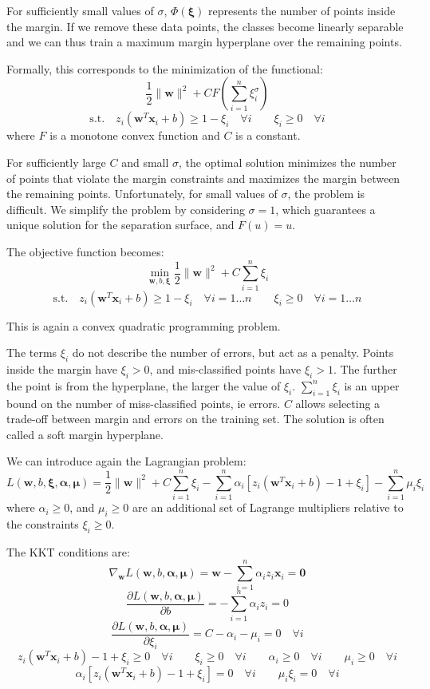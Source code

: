 For sufficiently small values of $\sigma$, $\Phi(\boldsymbol{\xi})$ represents the number of points inside the
margin. If we remove these data points, the classes become linearly separable and we can
thus train a maximum margin hyperplane over the remaining points.

Formally, this corresponds to the minimization of the functional:
\[
\frac{1}{2}\|\mathbf{w}\|^2 + CF\left(\sum_{i=1}^n \xi_i^\sigma\right)
\]
\[
\text{s.t.} \quad z_i(\mathbf{w}^T \mathbf{x}_i + b) \geq 1 - \xi_i \quad \forall i \qquad \xi_i \geq 0 \quad \forall i
\]
where $F$ is a monotone convex function and $C$ is a constant.

For sufficiently large $C$ and small $\sigma$, the optimal solution minimizes the number of points
that violate the margin constraints and maximizes the margin between the remaining
points. Unfortunately, for small values of $\sigma$, the problem is difficult. We simplify the
problem by considering $\sigma = 1$, which guarantees a unique solution for the separation
surface, and $F(u) = u$.

The objective function becomes:
\[
\min_{\mathbf{w},b,\boldsymbol{\xi}} \frac{1}{2}\|\mathbf{w}\|^2 + C\sum_{i=1}^n \xi_i
\]
\[
\text{s.t.} \quad z_i(\mathbf{w}^T \mathbf{x}_i + b) \geq 1 - \xi_i \quad \forall i = 1\ldots n \qquad \xi_i \geq 0 \quad \forall i = 1\ldots n
\]

This is again a convex quadratic programming problem.

The terms $\xi_i$ do not describe the number of errors, but act as a penalty. Points inside the
margin have $\xi_i > 0$, and mis-classified points have $\xi_i > 1$. The further the point is
from the hyperplane, the larger the value of $\xi_i$. $\sum_{i=1}^n \xi_i$ is an upper bound on the number
of miss-classified points, ie errors. $C$ allows selecting a trade-off between margin and
errors on the training set. The solution is often called a soft margin hyperplane.

We can introduce again the Lagrangian problem:
\[
L(\mathbf{w}, b, \boldsymbol{\xi}, \boldsymbol{\alpha}, \boldsymbol{\mu}) = \frac{1}{2}\|\mathbf{w}\|^2 + C\sum_{i=1}^n \xi_i - \sum_{i=1}^n \alpha_i \left[ z_i\left(\mathbf{w}^T \mathbf{x}_i + b\right) - 1 + \xi_i \right] - \sum_{i=1}^n \mu_i \xi_i
\]
where $\alpha_i \geq 0$, and $\mu_i \geq 0$ are an additional set of Lagrange multipliers relative to the
constraints $\xi_i \geq 0$.

The KKT conditions are:
\[
\nabla_\mathbf{w} L(\mathbf{w}, b, \boldsymbol{\alpha}, \boldsymbol{\mu}) = \mathbf{w} - \sum_{i=1}^n \alpha_i z_i \mathbf{x}_i = \mathbf{0}
\]
\[
\frac{\partial L(\mathbf{w}, b, \boldsymbol{\alpha}, \boldsymbol{\mu})}{\partial b} = -\sum_{i=1}^n \alpha_i z_i = 0
\]
\[
\frac{\partial L(\mathbf{w}, b, \boldsymbol{\alpha}, \boldsymbol{\mu})}{\partial \xi_i} = C - \alpha_i - \mu_i = 0 \quad \forall i
\]
\[
z_i(\mathbf{w}^T \mathbf{x}_i + b) - 1 + \xi_i \geq 0 \quad \forall i \qquad \xi_i \geq 0 \quad \forall i \qquad \alpha_i \geq 0 \quad \forall i \qquad \mu_i \geq 0 \quad \forall i
\]
\[
\alpha_i \left[ z_i\left(\mathbf{w}^T \mathbf{x}_i + b\right) - 1 + \xi_i \right] = 0 \quad \forall i \qquad \mu_i \xi_i = 0 \quad \forall i
\]

